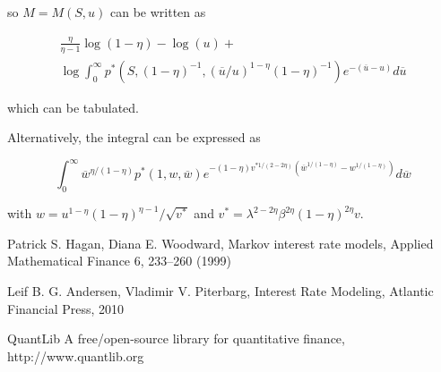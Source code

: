 \documentclass{amsart}
\theoremstyle{plain}
\numberwithin{equation}{section}
\begin{document}
so $M = M(S,u)$ can be written as 

\begin{eqnarray}
\frac{\eta}{\eta-1} \log (1-\eta) - \log(u) + \\
\log \int_{0}^{\infty} p^* ( S, (1-\eta)^{-1}, (\overline{u}/u)^{1-\eta}(1-\eta)^{-1} ) e^{-(\overline{u}-u)} d\overline{u}
\end{eqnarray}

which can be tabulated.

Alternatively, the integral can be expressed as

\begin{equation}
\int_{0}^{\infty} \overline{w}^{\eta/(1-\eta)}p^*(1,w,\overline{w})e^{-(1-\eta)v^{*1/(2-2\eta)}(\overline{w}^{1/(1-\eta)}-w^{1/(1-\eta)})} d\overline{w}
\end{equation}

with $w=u^{1-\eta}(1-\eta)^{\eta-1}/\sqrt{v^*}$ and $v^*= \lambda^{2-2\eta} \beta^{2\eta} (1-\eta)^{2\eta} v$.



\begin{thebibliography}{2}

 Patrick S. Hagan, Diana E. Woodward, Markov interest rate models, Applied Mathematical Finance 6, 233–260 (1999)

Leif B. G. Andersen, Vladimir V. Piterbarg, Interest Rate Modeling, Atlantic Financial Press, 2010

QuantLib A free/open-source library for quantitative finance, http://www.quantlib.org

\end{thebibliography}
\end{document}

